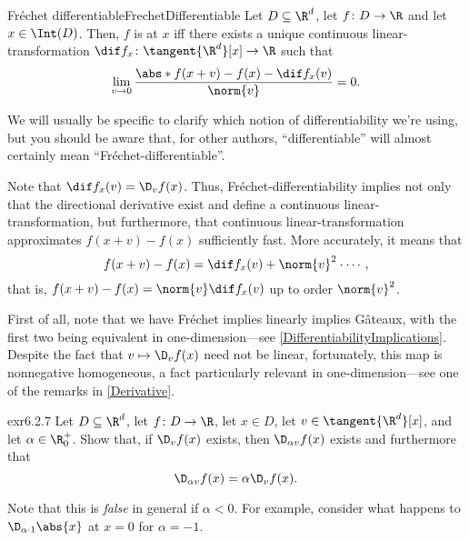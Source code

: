 \begin{dfn}{Fréchet differentiable}{FrechetDifferentiable}
	Let $D\subseteq \R ^d$, let $f\colon D\rightarrow \R$ and let $x\in \Int (D)$.  Then, $f$ is  at $x$ iff  there exists a unique continuous linear-transformation $\dif f_x\colon \tangent{\R ^d}[x]\rightarrow \R$ such that
	\begin{equation}
		\lim _{v\to 0}\frac{\abs*{f(x+v)-f(x)-\dif f_x(v)}}{\norm{v}}=0.
	\end{equation}
	\begin{rmk}
		We will usually be specific to clarify which notion of differentiability we're using, but you should be aware that, for other authors, ``differentiable'' will almost certainly mean ``Fréchet-differentiable''.
	\end{rmk}
	\begin{rmk}
		Note that $\dif f_x(v)=\D _vf(x)$.  Thus, Fréchet-differentiability implies not only that the directional derivative exist and define a continuous linear-transformation, but furthermore, that continuous linear-transformation approximates $f(x+v)-f(x)$ sufficiently fast.  More accurately, it means that
		\begin{equation}
			f(x+v)-f(x)=\dif f_x(v)+\norm{v}^2\cdot \cdots ,
		\end{equation}
		that is, $f(x+v)-f(x)=\norm{v}\dif f_x(v)$ up to order $\norm{v}^2$.
	\end{rmk}
\end{dfn}
First of all, note that we have Fréchet implies linearly implies Gâteaux, with the first two being equivalent in one-dimension---see \cref{DifferentiabilityImplications}.  Despite the fact that $v\mapsto \D _vf(x)$ need not be linear, fortunately, this map is nonnegative homogeneous, a fact particularly relevant in one-dimension---see one of the remarks in \cref{Derivative}.
\begin{exr}[breakable=false]{}{exr6.2.7}
Let $D\subseteq \R ^d$, let $f\colon D\rightarrow \R$, let $x\in D$, let $v\in \tangent{\R ^d}[x]$, and let $\alpha \in \R _0^+$.  Show that, if $\D _vf(x)$ exists, then $\D _{\alpha v}f(x)$ exists and furthermore that
\begin{equation}
\D _{\alpha v}f(x)=\alpha \D _vf(x).
\end{equation}
\begin{rmk}
	Note that this is \emph{false} in general if $\alpha <0$.  For example, consider what happens to $\D _{\alpha \cdot 1}\abs{x}$ at $x=0$ for $\alpha =-1$.
\end{rmk}
\end{exr}
